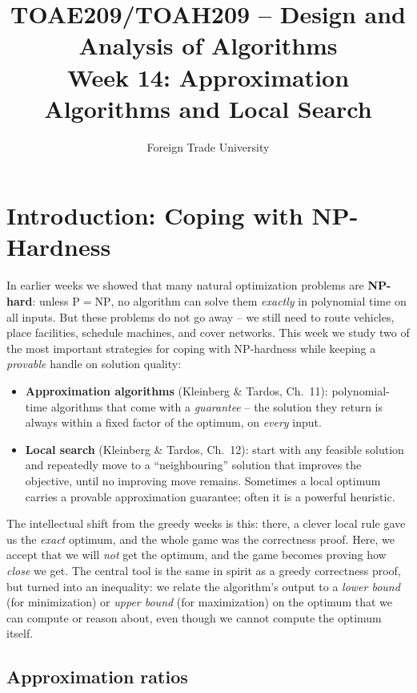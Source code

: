 \documentclass[11pt]{article}
\title{TOAE209/TOAH209 -- Design and Analysis of Algorithms\\[4pt]
\large Week 14: Approximation Algorithms and Local Search}
\author{Foreign Trade University}
\date{}
\begin{document}
\maketitle
\tableofcontents

\section{Introduction: Coping with NP-Hardness}

In earlier weeks we showed that many natural optimization problems are
\textbf{NP-hard}: unless $\mathrm{P} = \mathrm{NP}$, no algorithm can solve them
\emph{exactly} in polynomial time on all inputs. But these problems do not go away --
we still need to route vehicles, place facilities, schedule machines, and cover
networks. This week we study two of the most important strategies for coping with
NP-hardness while keeping a \emph{provable} handle on solution quality:

\begin{itemize}
    \item \textbf{Approximation algorithms} (Kleinberg \& Tardos, Ch.\ 11): polynomial-time
    algorithms that come with a \emph{guarantee} -- the solution they return is always
    within a fixed factor of the optimum, on \emph{every} input.
    \item \textbf{Local search} (Kleinberg \& Tardos, Ch.\ 12): start with any feasible
    solution and repeatedly move to a ``neighbouring'' solution that improves the
    objective, until no improving move remains. Sometimes a local optimum carries a
    provable approximation guarantee; often it is a powerful heuristic.
\end{itemize}

The intellectual shift from the greedy weeks is this: there, a clever local rule gave us
the \emph{exact} optimum, and the whole game was the correctness proof. Here, we accept
that we will \emph{not} get the optimum, and the game becomes proving how \emph{close} we
get. The central tool is the same in spirit as a greedy correctness proof, but turned
into an inequality: we relate the algorithm's output to a \emph{lower bound} (for
minimization) or \emph{upper bound} (for maximization) on the optimum that we can compute
or reason about, even though we cannot compute the optimum itself.

\subsection{Approximation ratios}
\end{document}
